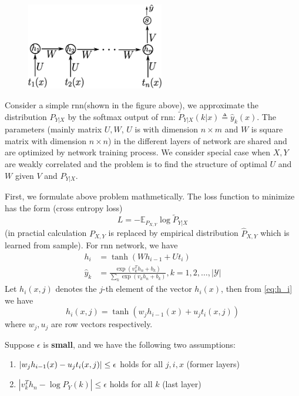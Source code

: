 \documentclass{article}
\DeclarePairedDelimiter\abs{\lvert}{\rvert}
\def\E{\mathbb{E}}
\def\Y{\mathcal{Y}}
\def\T{\mathrm{T}}
\begin{document}
\begin{figure}[!ht]
\centering
\includegraphics[width=6cm]{rnn.eps}
\end{figure}
Consider a simple rnn(shown in the figure above), we approximate the distribution $P_{Y|X}$ by the softmax output of rnn: $\widetilde{P}_{Y|X}(k|x) \triangleq \hat{y}_k(x)$. The parameters (mainly matrix $U,W$, $U$ is with dimension $n \times m$ and $W$ is square matrix with dimension $n\times n$) in the different layers of network are shared and are optimized by network training process. We consider special case when $X,Y$ are weakly correlated and the problem is to find the structure of optimal $U$ and $W$ given $V$ and $P_{Y|X}$.

First, we formulate above problem mathmetically. The loss function to minimize has the form (cross entropy loss) 
\begin{equation}\label{eq:cel}
L=-\E_{P_{X,Y}}\log \widetilde{P}_{Y|X}
\end{equation}
(in practial calculation $P_{X,Y}$ is replaced by empirical distribution $\hat{P}_{X,Y}$ which is learned from sample). For rnn network, we have
\begin{subequations}
\begin{align}
\label{eq:h_i} h_i & =  \tanh (W h_{i-1} + U t_i)\\
\label{eq:last_layer} \hat{y}_k & = \frac{\exp(v^T_k h_n+b_k)}{\sum_k \exp(v_k h_n+b_k)},k=1,2,\dots,|\Y|
\end{align}
\end{subequations}
Let $h_i(x,j)$ denotes the $j$\hspace{-0.4pt}-th element of the vector $h_i(x)$, then from \eqref{eq:h_i} we have
\begin{equation}\label{eq:act_item}
h_i(x,j)= \tanh (w_j h_{i-1}(x)+u_j t_i(x,j))
\end{equation}
where $w_j,u_j$ are row vectors respectively.

Suppose $\epsilon$ is  \textbf{small}, and we have the following two assumptions:
\begin{enumerate}
\item $\abs{w_j h_{i-1}(x) - u_j t_i(x,j) }\leq \epsilon$ holds for all $j,i,x$ (former layers) 
\item $|v_k^Th_n-\log P_Y(k)|\leq \epsilon$ holds for all $k$ (last layer)
\end{enumerate}
\end{document}
